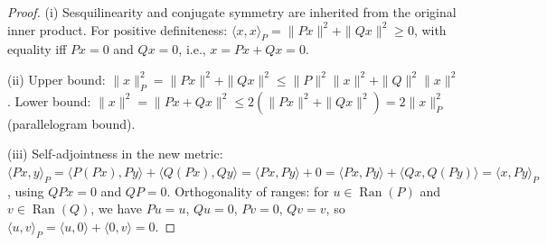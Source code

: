 \begin{proof}
(i) Sesquilinearity and conjugate symmetry are inherited from the original inner product.
For positive definiteness: $\langle x,x\rangle_P = \|Px\|^2 + \|Qx\|^2 \ge 0$, with equality iff $Px=0$ and $Qx=0$, i.e., $x = Px + Qx = 0$.

(ii) Upper bound: $\|x\|_P^2 = \|Px\|^2 + \|Qx\|^2 \le \|P\|^2\|x\|^2 + \|Q\|^2\|x\|^2$.
Lower bound: $\|x\|^2 = \|Px + Qx\|^2 \le 2(\|Px\|^2 + \|Qx\|^2) = 2\|x\|_P^2$ (parallelogram bound).

(iii) Self-adjointness in the new metric: $\langle Px,y\rangle_P = \langle P(Px),Py\rangle + \langle Q(Px),Qy\rangle = \langle Px,Py\rangle + 0 = \langle Px,Py\rangle + \langle Qx,Q(Py)\rangle = \langle x,Py\rangle_P$, using $QPx = 0$ and $QP = 0$.
Orthogonality of ranges: for $u\in\operatorname{Ran}(P)$ and $v\in\operatorname{Ran}(Q)$, we have $Pu=u$, $Qu=0$, $Pv=0$, $Qv=v$, so $\langle u,v\rangle_P = \langle u,0\rangle + \langle 0,v\rangle = 0$.
\end{proof}
